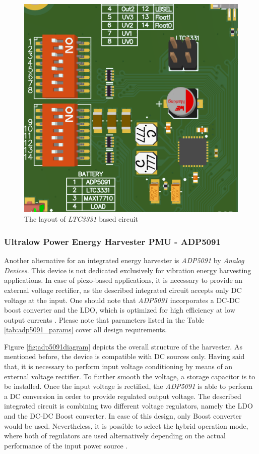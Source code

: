 \documentclass[12pt,a4paper]{article}
\begin{document}
\begin{figure}[ht!]
\includegraphics[scale=0.8]{ltc3331_layout.png}
\caption{The layout of \textit{LTC3331} based circuit}
\label{fig:ltc3331layout}
\end{figure}
\par

\subsubsection{Ultralow Power Energy Harvester PMU - ADP5091}

Another alternative for an integrated energy harvester is \textit{ADP5091} by \textit{Analog Devices}. This device is not dedicated exclusively for vibration energy harvesting applications. In case of piezo-based applications, it is necessary to provide an external voltage rectifier, as the described integrated circuit accepts only DC voltage at the input. One should note that \textit{ADP5091} incorporates a DC-DC boost converter and the LDO, which is optimized for high efficiency at low output currents \cite{adp5091_params}. Please note that parameters listed in the Table \ref{tab:adp5091_params} cover all design requirements.
\par

Figure \ref{fig:adp5091diagram} depicts the overall structure of the harvester. As mentioned before, the device is compatible with DC sources only. Having said that, it is necessary to perform input voltage conditioning by means of an external voltage rectifier. To further smooth the voltage, a storage capacitor is to be installed. Once the input voltage is rectified, the \textit{ADP5091} is able to perform a DC conversion in order to provide regulated output voltage. The described integrated circuit is combining two different voltage regulators, namely the LDO and the DC-DC Boost converter. In case of this design, only Boost converter would be used. Nevertheless, it is possible to select the hybrid operation mode, where both of regulators are used alternatively depending on the actual performance of the input power source  \cite{adp5091_params}.
\end{document}
